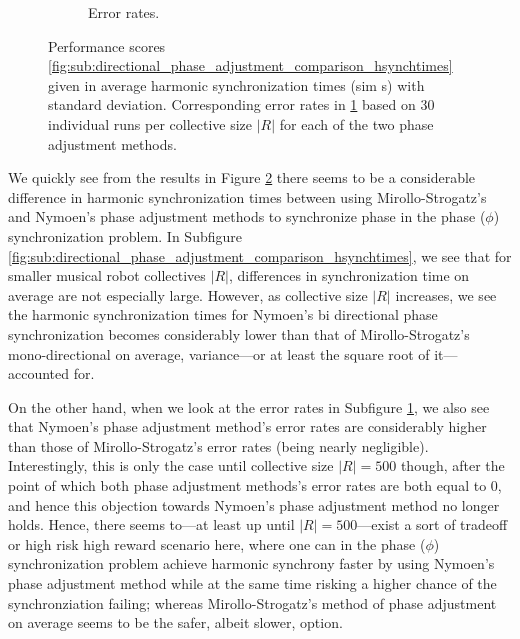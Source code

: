 \begin{figure}[ht!]
\begin{subfigure}[b]{0.5\textwidth}
			\caption{Error rates.}
			\label{fig:sub:directional_phase_adjustment_comparison_errorrates}
		  \end{subfigure}
		  \caption[Experiment results for comparative phase adjustment ($Adj_{\phi}$) method $\phi$ synchronization experiment.]{Performance scores \ref{fig:sub:directional_phase_adjustment_comparison_hsynchtimes} given in average harmonic synchronization times (sim s) with standard deviation. Corresponding error rates in \ref{fig:sub:directional_phase_adjustment_comparison_errorrates} based on 30 individual runs per collective size $|R|$ for each of the two phase adjustment methods.}
		  \label{fig:directional_phase_adjustment_comparison}
		\end{figure}
		
		We quickly see from the results in Figure \ref{fig:directional_phase_adjustment_comparison} there seems to be a considerable difference in harmonic synchronization times between using Mirollo-Strogatz's and Nymoen's phase adjustment methods to synchronize phase in the phase ($\phi$) synchronization problem. In Subfigure \ref{fig:sub:directional_phase_adjustment_comparison_hsynchtimes}, we see that for smaller musical robot collectives $|R|$, differences in synchronization time on average are not especially large. However, as collective size $|R|$ increases, we see the harmonic synchronization times for Nymoen's bi directional phase synchronization becomes considerably lower than that of Mirollo-Strogatz's mono-directional on average, variance—or at least the square root of it—accounted for.
		
		On the other hand, when we look at the error rates in Subfigure \ref{fig:sub:directional_phase_adjustment_comparison_errorrates}, we also see that Nymoen's phase adjustment method's error rates are considerably higher than those of Mirollo-Strogatz's error rates (being nearly negligible). Interestingly, this is only the case until collective size $|R|=500$ though, after the point of which both phase adjustment methods's error rates are both equal to 0, and hence this objection towards Nymoen's phase adjustment method no longer holds. Hence, there seems to—at least up until $|R|=500$—exist a sort of tradeoff or high risk high reward scenario here, where one can in the phase ($\phi$) synchronization problem achieve harmonic synchrony faster by using Nymoen's phase adjustment method while at the same time risking a higher chance of the synchronziation failing; whereas Mirollo-Strogatz's method of phase adjustment on average seems to be the safer, albeit slower, option.
		
